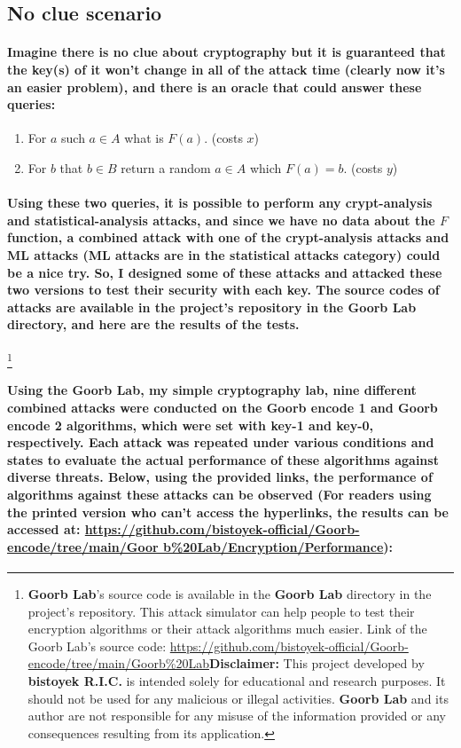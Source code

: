 \documentclass[oneside]{book}
\newcommand{\myparagraph}[1]{\paragraph{\textnormal{#1}}}
\begin{document}
\subsection{No clue scenario}

\myparagraph{
Imagine there is no clue about cryptography but it is guaranteed that the key(s) of it won't change in all of the attack time (clearly now it's an easier problem), and there is an oracle that could answer these queries:
}

\begin{enumerate}
    \item{For $a$ such $a \in A$ what is $F(a)$. (costs $x$)}
    \item{For $b$ that $b \in B$ return a random $a \in A$ which $F(a) = b$. (costs $y$)}
\end{enumerate}

\myparagraph{
Using these two queries, it is possible to perform any crypt-analysis and statistical-analysis attacks, and since we have no data about the $F$ function, a combined attack with one of the crypt-analysis attacks and ML attacks (ML attacks are in the statistical attacks category) could be a nice try. So, I designed some of these attacks and attacked these two versions to test their security with each key. The source codes of attacks are available in the project's repository in the \textbf{Goorb Lab} directory, and here are the results of the tests.
}
\footnote{\textbf{Goorb Lab}'s source code is available in the \textbf{Goorb Lab} directory in the project's repository. This attack simulator can help people to test their encryption algorithms or their attack algorithms much easier. \newline Link of the Goorb Lab's source code: \newline \href{https://github.com/bistoyek-official/Goorb-encode/tree/main/Goorb\%20Lab}{https://github.com/bistoyek-official/Goorb-encode/tree/main/Goorb\%20Lab}\newline \textbf{Disclaimer:} This project developed by \textbf{bistoyek R.I.C.} is intended solely for educational and research purposes. It should not be used for any malicious or illegal activities. \textbf{Goorb Lab} and its author are not responsible for any misuse of the information provided or any consequences resulting from its application.}

\myparagraph{
Using the \textbf{Goorb Lab}, my simple cryptography lab, nine different combined attacks were conducted on the \textbf{Goorb encode 1} and \textbf{Goorb encode 2} algorithms, which were set with \textbf{key-1} and \textbf{key-0}, respectively. Each attack was repeated under various conditions and states to evaluate the actual performance of these algorithms against diverse threats. Below, using the provided links, the performance of algorithms against these attacks can be observed (For readers using the printed version who can't access the hyperlinks, the results can be accessed at: \href{https://github.com/bistoyek-official/Goorb-encode/tree/main/Goorb\%20Lab/Encryption/Performance}{https://github.com/bistoyek-official/Goorb-encode/tree/main/Goor \newline b\%20Lab/Encryption/Performance}):
}
\end{document}
